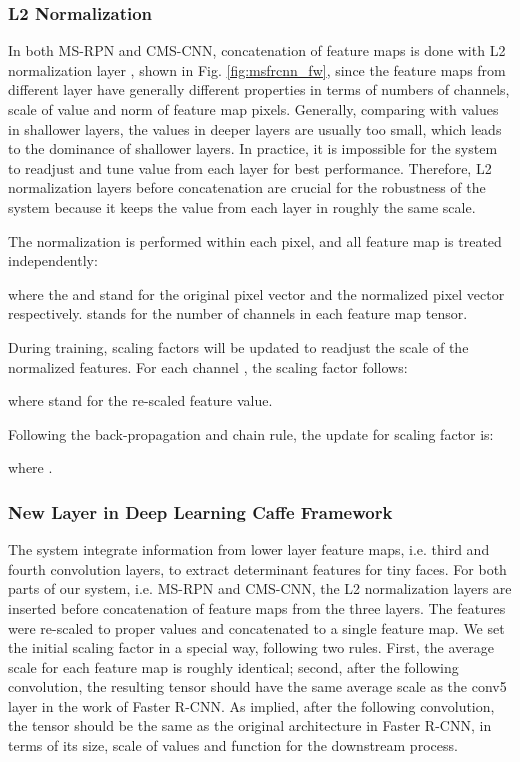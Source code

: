 \documentclass[10pt,journal,cspaper,compsoc]{IEEEtran}
\begin{document}
\subsubsection{L2 Normalization}
In both MS-RPN and CMS-CNN, concatenation of feature maps is done with L2 normalization layer \cite{liu2015parsenet}, shown in Fig. \ref{fig:msfrcnn_fw}, since the feature maps from different layer have generally different properties in terms of numbers of channels, scale of value and norm of feature map pixels. Generally, comparing with values in shallower layers, the values in deeper layers are usually too small, which leads to the dominance of shallower layers. In practice, it is impossible for the system to readjust and tune value from each layer for best performance. Therefore, L2 normalization layers before concatenation are crucial for the robustness of the system because it keeps the value from each layer in roughly the same scale. 

The normalization is performed within each pixel, and all feature map is treated independently:


where the  and  stand for the original pixel vector and the normalized pixel vector respectively.  stands for the number of channels in each feature map tensor. 

During training, scaling factors  will be updated to readjust the scale of the normalized features. For each channel , the scaling factor follows: 

where  stand for the re-scaled feature value. 

Following the back-propagation and chain rule, the update for scaling factor  is:

where . 

\subsubsection{New Layer in Deep Learning Caffe Framework}
\label{subsec:ms_caffe}

The system integrate information from lower layer feature maps, i.e. third and fourth convolution layers, to extract determinant features for tiny faces. For both parts of our system, i.e. MS-RPN and CMS-CNN, the L2 normalization layers are inserted before concatenation of feature maps from the three layers. The features were re-scaled to proper values and concatenated to a single feature map. We set the initial scaling factor in a special way, following two rules. First, the average scale for each feature map is roughly identical; second, after the following  convolution, the resulting tensor should have the same average scale as the conv5 layer in the work of Faster R-CNN. As implied, after the following  convolution, the tensor should be the same as the original architecture in Faster R-CNN, in terms of its size, scale of values and function for the downstream process.  
\end{document}
